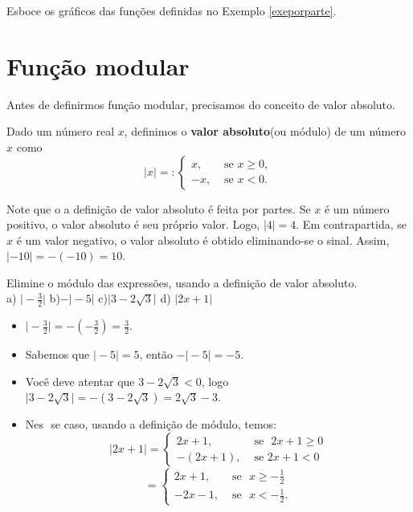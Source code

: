 \begin{exe}
	Esboce os gráficos das funções definidas no Exemplo \ref{exeporparte}.
\end{exe}

\vspace{6cm}

\section{Função modular}
Antes de definirmos função modular, precisamos do conceito de valor absoluto.
\begin{defin}  Dado um número real $x$, definimos o \textbf{valor absoluto}(ou módulo) de um número $x$ como
\[|x|=: \begin{cases}
x,& \text{ se } x\geq 0,\\
-x,& \text{ se }x<0.
\end{cases} \]

Note que o a definição de valor absoluto é feita por partes. Se $x$ é um número positivo, o valor absoluto é seu próprio valor. Logo, $|4|=4$. Em contrapartida, se $x$ é um valor negativo, o valor absoluto é obtido eliminando-se o sinal. Assim, $|-10|=-(-10)=10$.
\end{defin}


\begin{exe}Elimine o módulo das expressões, usando a definição de valor absoluto. \\
a) $\vert -\frac{3}{2} \vert$ \hspace{1cm} b)$-\vert -5 \vert $ \hspace{1cm} c)$\vert 3-2\sqrt{3} \vert$ \hspace{1cm} d) $\vert 2x+1 \vert$ \hspace{1cm} %
\color{red}
\begin{itemize}
    \item[a)] $\vert -\frac{3}{2} \vert = - \left(-\frac{3}{2} \right)= \frac{3}{2}$. \\
    \item[b)] Sabemos que $\vert -5\vert=5$, então $-\vert -5 \vert =-5.$
    \item[c)] Você deve atentar que $3-2\sqrt{3}<0$, logo $\vert 3-2\sqrt{3} \vert=-(3-2\sqrt{3} )= 2\sqrt{3}-3$.
    \item[d)] Nes \,\,se caso, usando a definição de módulo, temos:
    \[|2x+1|= \begin{cases}
2x+1,& \text{ se } \,\, 2x+ 1 \geq 0\\
-(2x+1),& \text{ se }2x+1<0
\end{cases} \]\[= \begin{cases}
2x+1,& \text{ se } \,\,x\geq -\frac{1}{2}\\
-2x-1,& \text{ se }\,\,x< -\frac{1}{2}.
\end{cases} \]

\end{itemize}
\color{black}
\end{exe}


